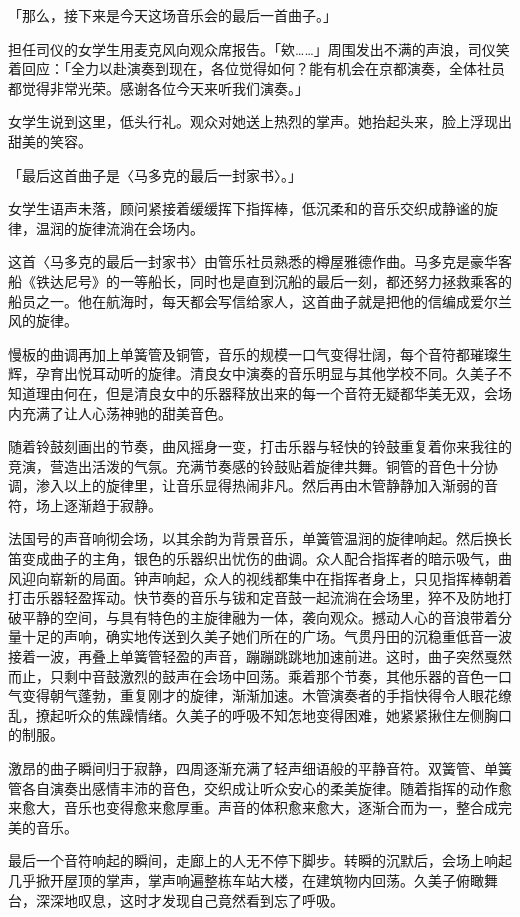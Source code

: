 \documentclass[UTF8]{ctexart}
\begin{document}
    「那么，接下来是今天这场音乐会的最后一首曲子。」 

    担任司仪的女学生用麦克风向观众席报告。「欸……」周围发出不满的声浪，司仪笑着回应：「全力以赴演奏到现在，各位觉得如何？能有机会在京都演奏，全体社员都觉得非常光荣。感谢各位今天来听我们演奏。」 

    女学生说到这里，低头行礼。观众对她送上热烈的掌声。她抬起头来，脸上浮现出甜美的笑容。 

    「最后这首曲子是〈马多克的最后一封家书〉。」 

    女学生语声未落，顾问紧接着缓缓挥下指挥棒，低沉柔和的音乐交织成静谧的旋律，温润的旋律流淌在会场内。 

    这首〈马多克的最后一封家书〉由管乐社员熟悉的樽屋雅德作曲。马多克是豪华客船《铁达尼号》的一等船长，同时也是直到沉船的最后一刻，都还努力拯救乘客的船员之一。他在航海时，每天都会写信给家人，这首曲子就是把他的信编成爱尔兰风的旋律。 

    慢板的曲调再加上单簧管及铜管，音乐的规模一口气变得壮阔，每个音符都璀璨生辉，孕育出悦耳动听的旋律。清良女中演奏的音乐明显与其他学校不同。久美子不知道理由何在，但是清良女中的乐器释放出来的每一个音符无疑都华美无双，会场内充满了让人心荡神驰的甜美音色。 

    随着铃鼓刻画出的节奏，曲风摇身一变，打击乐器与轻快的铃鼓重复着你来我往的竞演，营造出活泼的气氛。充满节奏感的铃鼓贴着旋律共舞。铜管的音色十分协调，渗入以上的旋律里，让音乐显得热闹非凡。然后再由木管静静加入渐弱的音符，场上逐渐趋于寂静。 

    法国号的声音响彻会场，以其余韵为背景音乐，单簧管温润的旋律响起。然后换长笛变成曲子的主角，银色的乐器织出忧伤的曲调。众人配合指挥者的暗示吸气，曲风迎向崭新的局面。钟声响起，众人的视线都集中在指挥者身上，只见指挥棒朝着打击乐器轻盈挥动。快节奏的音乐与钹和定音鼓一起流淌在会场里，猝不及防地打破平静的空间，与具有特色的主旋律融为一体，袭向观众。撼动人心的音浪带着分量十足的声响，确实地传送到久美子她们所在的广场。气贯丹田的沉稳重低音一波接着一波，再叠上单簧管轻盈的声音，蹦蹦跳跳地加速前进。这时，曲子突然戛然而止，只剩中音鼓激烈的鼓声在会场中回荡。乘着那个节奏，其他乐器的音色一口气变得朝气蓬勃，重复刚才的旋律，渐渐加速。木管演奏者的手指快得令人眼花缭乱，撩起听众的焦躁情绪。久美子的呼吸不知怎地变得困难，她紧紧揪住左侧胸口的制服。 

    激昂的曲子瞬间归于寂静，四周逐渐充满了轻声细语般的平静音符。双簧管、单簧管各自演奏出感情丰沛的音色，交织成让听众安心的柔美旋律。随着指挥的动作愈来愈大，音乐也变得愈来愈厚重。声音的体积愈来愈大，逐渐合而为一，整合成完美的音乐。 

    最后一个音符响起的瞬间，走廊上的人无不停下脚步。转瞬的沉默后，会场上响起几乎掀开屋顶的掌声，掌声响遍整栋车站大楼，在建筑物内回荡。久美子俯瞰舞台，深深地叹息，这时才发现自己竟然看到忘了呼吸。 
\end{document}

